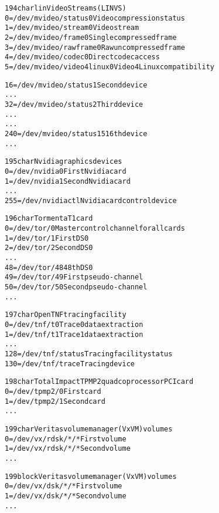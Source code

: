 \documentclass[a4paper,8pt,english]{sphinxmanual}
\begin{document}
\begin{alltt}
 194 char       linVideoStreams (LINVS)
                  0 = /dev/mvideo/status0       Video compression status
                  1 = /dev/mvideo/stream0       Video stream
                  2 = /dev/mvideo/frame0        Single compressed frame
                  3 = /dev/mvideo/rawframe0     Raw uncompressed frame
                  4 = /dev/mvideo/codec0        Direct codec access
                  5 = /dev/mvideo/video4linux0  Video4Linux compatibility

                 16 = /dev/mvideo/status1       Second device
                    ...
                 32 = /dev/mvideo/status2       Third device
                    ...
                    ...
                240 = /dev/mvideo/status15      16th device
                    ...

 195 char       Nvidia graphics devices
                  0 = /dev/nvidia0              First Nvidia card
                  1 = /dev/nvidia1              Second Nvidia card
                    ...
                255 = /dev/nvidiactl            Nvidia card control device

 196 char       Tormenta T1 card
                  0 = /dev/tor/0                Master control channel for all cards
                  1 = /dev/tor/1                First DS0
                  2 = /dev/tor/2                Second DS0
                    ...
                 48 = /dev/tor/48               48th DS0
                 49 = /dev/tor/49               First pseudo-channel
                 50 = /dev/tor/50               Second pseudo-channel
                    ...

 197 char       OpenTNF tracing facility
                  0 = /dev/tnf/t0               Trace 0 data extraction
                  1 = /dev/tnf/t1               Trace 1 data extraction
                    ...
                128 = /dev/tnf/status           Tracing facility status
                130 = /dev/tnf/trace            Tracing device

 198 char       Total Impact TPMP2 quad coprocessor PCI card
                  0 = /dev/tpmp2/0              First card
                  1 = /dev/tpmp2/1              Second card
                    ...

 199 char       Veritas volume manager (VxVM) volumes
                  0 = /dev/vx/rdsk/*/*          First volume
                  1 = /dev/vx/rdsk/*/*          Second volume
                    ...

 199 block      Veritas volume manager (VxVM) volumes
                  0 = /dev/vx/dsk/*/*           First volume
                  1 = /dev/vx/dsk/*/*           Second volume
                    ...


\end{alltt}
\end{document}
